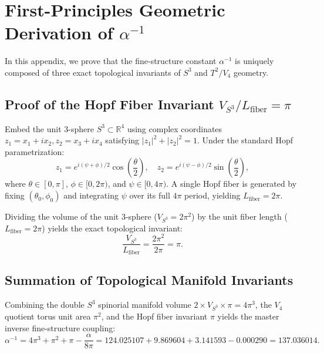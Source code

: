 \documentclass[11pt,a4paper]{article}
\begin{document}
	\appendix
	\section{First-Principles Geometric Derivation of $\alpha^{-1}$}
	\label{app:alpha_derivation}
	
	In this appendix, we prove that the fine-structure constant $\alpha^{-1}$ is uniquely composed of three exact topological invariants of $S^3$ and $T^2/V_4$ geometry.
	
	\subsection{Proof of the Hopf Fiber Invariant $V_{S^3} / L_{\text{fiber}} = \pi$}
	Embed the unit 3-sphere $S^3 \subset \mathbb{R}^4$ using complex coordinates $z_1 = x_1 + i x_2, z_2 = x_3 + i x_4$ satisfying $|z_1|^2 + |z_2|^2 = 1$. Under the standard Hopf parametrization:
	\begin{equation}
		z_1 = e^{i(\psi+\phi)/2} \cos\left(\frac{\theta}{2}\right), \quad z_2 = e^{i(\psi-\phi)/2} \sin\left(\frac{\theta}{2}\right),
	\end{equation}
	where $\theta \in [0, \pi]$, $\phi \in [0, 2\pi)$, and $\psi \in [0, 4\pi)$. A single Hopf fiber is generated by fixing $(\theta_0, \phi_0)$ and integrating $\psi$ over its full $4\pi$ period, yielding $L_{\text{fiber}} = 2\pi$.
	
	Dividing the volume of the unit 3-sphere ($V_{S^3} = 2\pi^2$) by the unit fiber length ($L_{\text{fiber}} = 2\pi$) yields the exact topological invariant:
	\begin{equation}
		\frac{V_{S^3}}{L_{\text{fiber}}} = \frac{2\pi^2}{2\pi} = \pi.
		\label{eq:volume_fiber_ratio}
	\end{equation}
	
	\subsection{Summation of Topological Manifold Invariants}
	Combining the double $S^3$ spinorial manifold volume $2 \times V_{S^3} \times \pi = 4\pi^3$, the $V_4$ quotient torus unit area $\pi^2$, and the Hopf fiber invariant $\pi$ yields the master inverse fine-structure coupling:
	\begin{equation}
		\alpha^{-1} = 4\pi^3 + \pi^2 + \pi - \frac{\alpha}{8\pi} = 124.025107 + 9.869604 + 3.141593 - 0.000290 = \mathbf{137.036014}.
		\label{eq:alpha_exact_proof_appendix}
	\end{equation}
	
\end{document}
